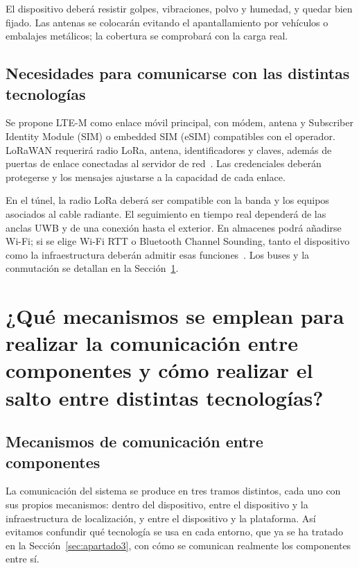 \documentclass[11pt,a4paper]{article}
\begin{document}
El dispositivo deberá resistir golpes, vibraciones, polvo y humedad, y quedar bien fijado. Las antenas se colocarán evitando el apantallamiento por vehículos o embalajes metálicos; la cobertura se comprobará con la carga real.

\subsection{Necesidades para comunicarse con las distintas tecnologías}
\label{sec:apartado4_3}

Se propone LTE-M como enlace móvil principal, con módem, antena y Subscriber Identity Module (SIM) o embedded SIM (eSIM) compatibles con el operador. LoRaWAN requerirá radio LoRa, antena, identificadores y claves, además de puertas de enlace conectadas al servidor de red~\cite{ref24}. Las credenciales deberán protegerse y los mensajes ajustarse a la capacidad de cada enlace.

En el túnel, la radio LoRa deberá ser compatible con la banda y los equipos asociados al cable radiante. El seguimiento en tiempo real dependerá de las anclas UWB y de una conexión hasta el exterior. En almacenes podrá añadirse Wi-Fi; si se elige Wi-Fi RTT o Bluetooth Channel Sounding, tanto el dispositivo como la infraestructura deberán admitir esas funciones~\cite{ref18,ref19}. Los buses y la conmutación se detallan en la Sección~\ref{sec:apartado5}.

\clearpage
\section{¿Qué mecanismos se emplean para realizar la comunicación entre componentes y cómo realizar el salto entre distintas tecnologías?}
\label{sec:apartado5}

\subsection{Mecanismos de comunicación entre componentes}
\label{sec:apartado5_1}

La comunicación del sistema se produce en tres tramos distintos, cada uno con sus propios mecanismos: dentro del dispositivo, entre el dispositivo y la infraestructura de localización, y entre el dispositivo y la plataforma. Así evitamos confundir qué tecnología se usa en cada entorno, que ya se ha tratado en la Sección~\ref{sec:apartado3}, con cómo se comunican realmente los componentes entre sí.
\end{document}
